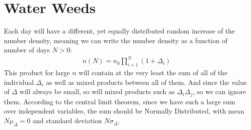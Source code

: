 \documentclass[12pt]{article}
\begin{document}
\section{Water Weeds}
Each day will have a different, yet equally distributed random increase of the number density, meaning we can write the number density as a function of number of days $N>0$:
\begin{align*}
  n(N)=n_0\prod_{i=1}^N(1+\Delta_i)
\end{align*}
This product for large $n$ will contain at the very least the sum of all of the individual $\Delta_i$ as well as mixed products between all of them. And since the value of $\Delta$ will always be small, so will mixed products such as $\Delta_i\Delta_j$, so we can ignore them. According to the central limit theorem, since we have such a large sum over independent variables, the sum should be Normally Distributed, with mean $N\mu_{\Delta}=0$ and standard deviation $N\sigma_\Delta$.
\end{document}
